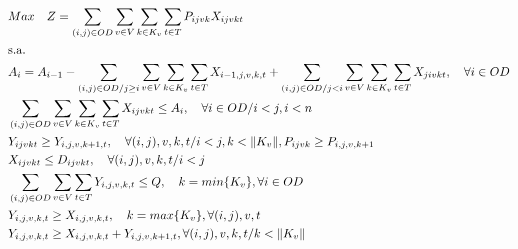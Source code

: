 \begin{align}
	 & Max \quad Z = \sum_{(i,j)\in OD} \sum_{v\in V} \sum_{k\in K_v} \sum_{t\in T} P_{ijvk} X_{ijvkt}                                                                                                                \label{eq: m1_fo}                          \\
	 & \text{s.a.}  \notag                                                                                                                                                                                                                                       \\
	 & A_{i} = A_{i-1} - \sum_{(i,j) \in OD/j \geq i} \sum_{v\in V} \sum_{k\in K_v}\sum_{t\in T}X_{i-1,j,v,k,t} + \sum_{(i,j) \in OD/j<i}\sum_{v\in V} \sum_{k\in K_v}\sum_{t\in T}X_{jivkt}, \quad \forall i \in OD  \label{eq: m1_disponi}                     \\
	 & \sum_{(i,j) \in OD}\sum_{v\in V} \sum_{k\in K_v}\sum_{t\in T} X_{ijvkt} \leq A_{i} , \quad \forall i \in OD /i<j, i < n                                                                                        \label{eq: m1_cap_assig}                   \\
	 & Y_{ijvkt} \geq Y_{i,j,v,k+1,t},  \quad \forall (i,j),v,k,t / i < j, k < \lVert K_v \rVert,  P_{ijvk} \geq P_{i,j,v,k+1}                                                                                        \label{eq: m1_jerar_class}                 \\
	 & X_{ijvkt} \leq D_{ijvkt},  \quad \forall (i,j),v,k,t/ i < j                                                                                                                                                    \label{eq: m1_assig_menor_dem}             \\
	 & \sum_{(i,j) \in OD}\sum_{v\in V}\sum_{t\in T} Y_{i,j,v,k,t} \leq Q, \quad  k = min\{K_v\}, \forall i \in OD                                                                                                    \label{eq: m1_cap_autho_1er_class}         \\
	 & Y_{i,j,v,k,t} \geq  X_{i,j,v,k,t},  \quad k = max\{K_v\}, \forall(i,j),v,t                                                                                                                                     \label{eq: m1_autho_mayor_assig_1er_class} \\
	 & Y_{i,j,v,k,t} \geq  X_{i,j,v,k,t} + Y_{i,j,v,k + 1,t} , \forall(i,j),v, k, t / k < \lVert K_v\rVert                                                                                                            \label{eq: m1_autho_mayor_assig_mas_autho} \\

\end{align}
